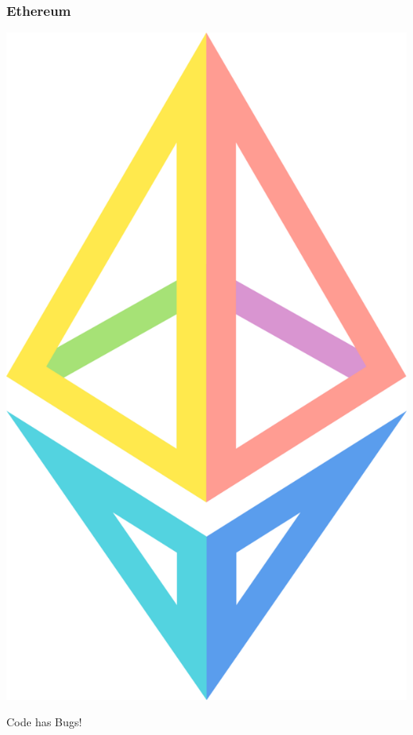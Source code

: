 \documentclass[aspectratio=169,17pt]{beamer}
\begin{document}
\begin{frame}
	\frametitle{Ethereum}
	\centering
	\includegraphics[height=.9\textheight]{assets/Eth-diamond-rainbow.png}
\end{frame}

\begin{frame}
	\centering
	Code has Bugs!
\end{frame}
\end{document}
